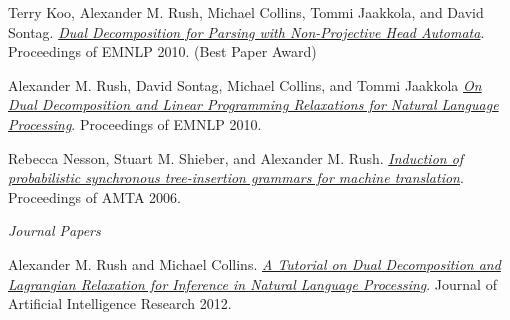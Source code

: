 \documentclass[10pt]{article}
\begin{document}
\medskip

\ind Terry Koo, Alexander M. Rush, Michael Collins, Tommi Jaakkola, and David Sontag. \emph{\href{http://people.csail.mit.edu/maestro/papers/koo10mstdd.pdf}{Dual Decomposition for Parsing with Non-Projective Head Automata}}. Proceedings of EMNLP 2010. (Best Paper Award)

\medskip

\ind Alexander M. Rush, David Sontag, Michael Collins, and Tommi Jaakkola \emph{\href{http://people.csail.mit.edu/dsontag/papers/RusSonColJaa_emnlp10.pdf}{On Dual Decomposition and Linear Programming Relaxations for Natural Language Processing}}. Proceedings of EMNLP 2010.

\medskip
\ind Rebecca Nesson, Stuart M. Shieber, and Alexander M. Rush. \emph{\href{http://www.eecs.harvard.edu/~shieber/Biblio/Papers/Nesson-2006-IPS.pdf}{Induction of probabilistic synchronous tree-insertion grammars for machine translation}}. Proceedings of AMTA 2006.

\vspace{0.3in}

\noindent\emph{Journal Papers \vspace{0.01in}}

\ind Alexander M. Rush and Michael Collins. \emph{\href{http://www.cs.columbia.edu/~mcollins/acltutorial.pdf}{A Tutorial on Dual Decomposition and Lagrangian Relaxation for Inference in Natural Language Processing}}. Journal of Artificial Intelligence Research 2012.







\end{document}
